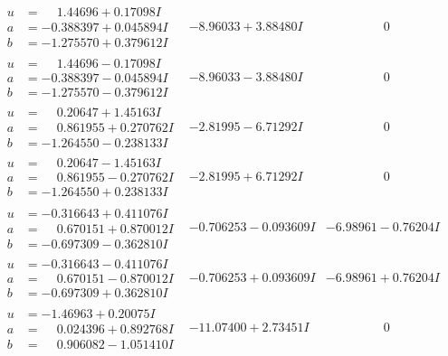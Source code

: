 \documentclass[1p]{elsarticle_modified}
\theoremstyle{definition}
\begin{document}
$$\begin{array}{c|c|c}
\begin{aligned}
u &= \phantom{-}1.44696 + 0.17098 I \\
a &= -0.388397 + 0.045894 I \\
b &= -1.275570 + 0.379612 I\end{aligned}
 & -8.96033 + 3.88480 I & \phantom{-0.000000 } 0 \\ \hline\begin{aligned}
u &= \phantom{-}1.44696 - 0.17098 I \\
a &= -0.388397 - 0.045894 I \\
b &= -1.275570 - 0.379612 I\end{aligned}
 & -8.96033 - 3.88480 I & \phantom{-0.000000 } 0 \\ \hline\begin{aligned}
u &= \phantom{-}0.20647 + 1.45163 I \\
a &= \phantom{-}0.861955 + 0.270762 I \\
b &= -1.264550 - 0.238133 I\end{aligned}
 & -2.81995 - 6.71292 I & \phantom{-0.000000 } 0 \\ \hline\begin{aligned}
u &= \phantom{-}0.20647 - 1.45163 I \\
a &= \phantom{-}0.861955 - 0.270762 I \\
b &= -1.264550 + 0.238133 I\end{aligned}
 & -2.81995 + 6.71292 I & \phantom{-0.000000 } 0 \\ \hline\begin{aligned}
u &= -0.316643 + 0.411076 I \\
a &= \phantom{-}0.670151 + 0.870012 I \\
b &= -0.697309 - 0.362810 I\end{aligned}
 & -0.706253 - 0.093609 I & -6.98961 - 0.76204 I \\ \hline\begin{aligned}
u &= -0.316643 - 0.411076 I \\
a &= \phantom{-}0.670151 - 0.870012 I \\
b &= -0.697309 + 0.362810 I\end{aligned}
 & -0.706253 + 0.093609 I & -6.98961 + 0.76204 I \\ \hline\begin{aligned}
u &= -1.46963 + 0.20075 I \\
a &= \phantom{-}0.024396 + 0.892768 I \\
b &= \phantom{-}0.906082 - 1.051410 I\end{aligned}
 & -11.07400 + 2.73451 I & \phantom{-0.000000 } 0 \\ \hline\begin{aligned}

\end{aligned}
\end{array}$$
\end{document}
